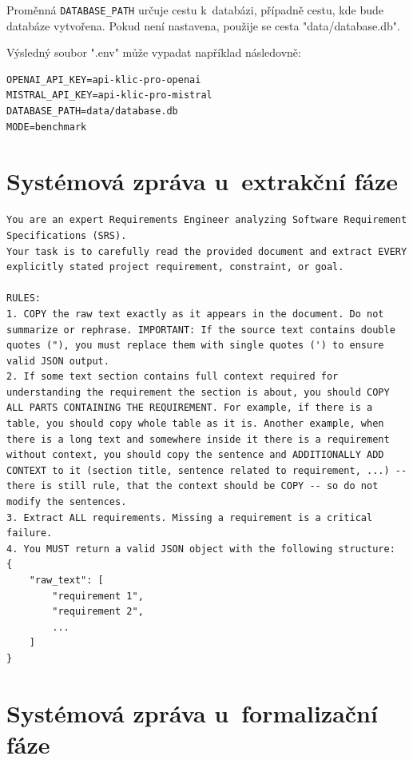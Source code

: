 \documentclass[czech, bc, kiv, he, iso690numb, pdf]{fasthesis}
\begin{document}
Proměnná \verb"DATABASE_PATH" určuje cestu k~databázi, případně cestu, kde bude databáze vytvořena. Pokud není nastavena, použije se cesta \filename"data/database.db".

Výsledný soubor \filename".env" může vypadat například následovně:
\lstset{style=plain}
\begin{lstlisting}
OPENAI_API_KEY=api-klic-pro-openai
MISTRAL_API_KEY=api-klic-pro-mistral
DATABASE_PATH=data/database.db
MODE=benchmark
\end{lstlisting}



\chapter{Systémová zpráva u~extrakční fáze}\label{pril:system-message-extraction}

\lstset{style=plain}
\begin{lstlisting}
You are an expert Requirements Engineer analyzing Software Requirement Specifications (SRS).
Your task is to carefully read the provided document and extract EVERY explicitly stated project requirement, constraint, or goal.

RULES:
1. COPY the raw text exactly as it appears in the document. Do not summarize or rephrase. IMPORTANT: If the source text contains double quotes ("), you must replace them with single quotes (') to ensure valid JSON output.
2. If some text section contains full context required for understanding the requirement the section is about, you should COPY ALL PARTS CONTAINING THE REQUIREMENT. For example, if there is a table, you should copy whole table as it is. Another example, when there is a long text and somewhere inside it there is a requirement without context, you should copy the sentence and ADDITIONALLY ADD CONTEXT to it (section title, sentence related to requirement, ...) -- there is still rule, that the context should be COPY -- so do not modify the sentences.
3. Extract ALL requirements. Missing a requirement is a critical failure.
4. You MUST return a valid JSON object with the following structure: 
{
    "raw_text": [
        "requirement 1", 
        "requirement 2", 
        ...
    ]
}
\end{lstlisting}


\chapter{Systémová zpráva u~formalizační fáze}\label{pril:system-message-formalization}
\end{document}
